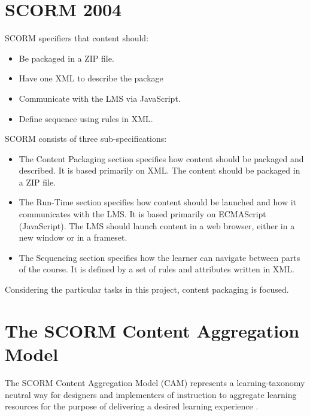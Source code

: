\section{SCORM 2004}
SCORM specifiers that content should:
\begin{itemize}
	\item
		Be packaged in a ZIP file.
	\item
		Have one XML to describe the package
	\item
		Communicate with the LMS via JavaScript.
	\item
		Define sequence using rules in XML.
\end{itemize}
SCORM consists of three sub-specifications:
\begin{itemize}
	\item
		The Content Packaging section specifies how content should be packaged and described. It is based primarily on XML. The content should be 
		packaged in a ZIP file.
	\item
		The Run-Time section specifies how content should be launched and how it communicates with the LMS. It is based primarily on ECMAScript 
		(JavaScript). The LMS should launch content in a web browser, either in a new window or in a frameset.
	\item
		The Sequencing section specifies how the learner can navigate between parts of the course. It is defined by a set of rules and attributes 
		written in XML.
\end{itemize}

Considering the particular tasks in this project, content packaging is focused.
\section{The SCORM Content Aggregation Model}
The SCORM Content Aggregation Model (CAM) represents a learning-taxonomy neutral way for designers and implementers of instruction to aggregate 
learning resources for the purpose of delivering a desired learning experience \cite{cambook}.

